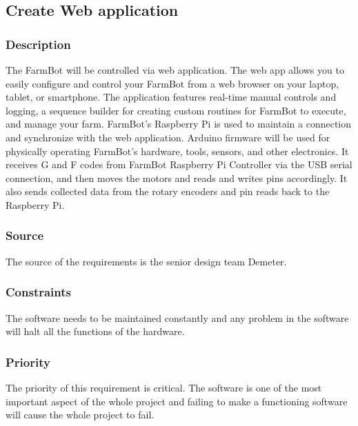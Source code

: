 \subsection{Create Web application}
\subsubsection{Description}
The FarmBot will be controlled via web application. The web app allows you to easily configure and control your FarmBot from a web browser on your laptop, tablet, or smartphone. The application features real-time manual controls and logging, a sequence builder for creating custom routines for FarmBot to execute, and manage your farm. FarmBot's Raspberry Pi is used to maintain a connection and synchronize with the web application. Arduino firmware will be used for physically operating FarmBot's hardware, tools, sensors, and other electronics. It receives G and F codes from FarmBot Raspberry Pi Controller via the USB serial connection, and then moves the motors and reads and writes pins accordingly. It also sends collected data from the rotary encoders and pin reads back to the Raspberry Pi.
\subsubsection{Source}
The source of the requirements is the senior design team Demeter.
\subsubsection{Constraints}
The software needs to be maintained constantly and any problem in the software will halt all the functions of the hardware.
\subsubsection{Priority}
The priority of this requirement is critical. The software is one of the most important aspect of the whole project and failing to make a functioning software will cause the whole project to fail.
